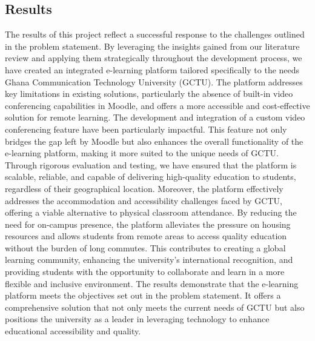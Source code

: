 \documentclass[a4paper,12pt]{article}  %
\begin{document}
\subsection{Results}
The results of this project reflect a successful response to the challenges outlined in the problem statement. By leveraging the insights gained from our literature review and applying them strategically throughout the development process, we have created an integrated e-learning platform tailored specifically to the needs Ghana Communication Technology University (GCTU). The platform addresses key limitations in existing solutions, particularly the absence of built-in video conferencing capabilities in Moodle, and offers a more accessible and cost-effective solution for remote learning. The development and integration of a custom video conferencing feature have been particularly impactful. This feature not only bridges the gap left by Moodle but also enhances the overall functionality of the e-learning platform, making it more suited to the unique needs of GCTU. Through rigorous evaluation and testing, we have ensured that the platform is scalable, reliable, and capable of delivering high-quality education to students, regardless of their geographical location. Moreover, the platform effectively addresses the accommodation and accessibility challenges faced by GCTU, offering a viable alternative to physical classroom attendance. By reducing the need for on-campus presence, the platform alleviates the pressure on housing resources and allows students from remote areas to access quality education without the burden of long commutes. This contributes to creating a global learning community, enhancing the university's international recognition, and providing students with the opportunity to collaborate and learn in a more flexible and inclusive environment. The results demonstrate that the e-learning platform meets the objectives set out in the problem statement. It offers a comprehensive solution that not only meets the current needs of GCTU but also positions the university as a leader in leveraging technology to enhance educational accessibility and quality.\\
\end{document}
